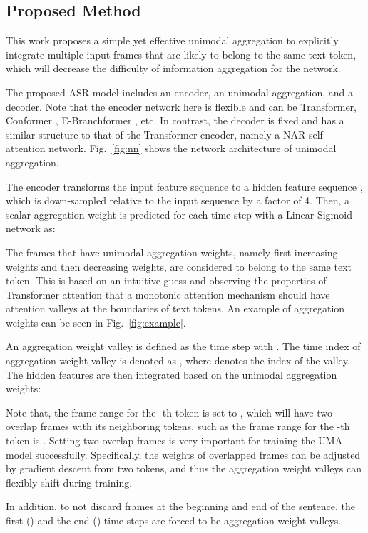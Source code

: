 \documentclass{article}
\begin{document}
\subsection{Proposed Method}
\label{sec:proposed}

This work proposes a simple yet effective unimodal aggregation to explicitly integrate multiple input frames that are likely to belong to the same text token, which will decrease the difficulty of information aggregation for the network. 

The proposed ASR model includes an encoder, an unimodal aggregation, and a decoder. Note that the encoder network here is flexible and can be Transformer, Conformer \cite{gulati2020conformer}, E-Branchformer \cite{kim2023branchformer}, etc. In contrast, the decoder is fixed and has a similar structure to that of the Transformer encoder, namely a NAR self-attention network. Fig.~\ref{fig:nn} shows the network architecture of unimodal aggregation. 

The encoder transforms the input feature sequence  to a hidden feature sequence , which is down-sampled relative to the input sequence by a factor of 4. Then, a scalar aggregation weight is predicted for each time step with a Linear-Sigmoid network as:

The frames that have unimodal aggregation weights, namely first increasing weights and then decreasing weights, are considered to belong to the same text token. This is based on an intuitive guess and observing the
properties of Transformer attention that a monotonic attention
mechanism should have attention valleys at the boundaries of
text tokens. An example of aggregation weights can be seen in Fig.~\ref{fig:example}.

An aggregation weight valley  is defined as the time step with . The time index of aggregation weight valley is denoted as , where  denotes the index of the valley. The hidden features are then integrated based on the unimodal aggregation weights:

Note that, the frame range for the -th token is set to , which will have two overlap frames with its neighboring tokens, such as the frame range for the -th token is . Setting two overlap frames is very important for training the UMA model successfully. Specifically, the weights of overlapped frames can be adjusted by gradient descent from two tokens, and thus the aggregation weight valleys can flexibly shift during training. 

In addition, to not discard frames at the beginning and end of the sentence, the first () and the end () time steps are forced to be aggregation weight valleys. 
\end{document}
